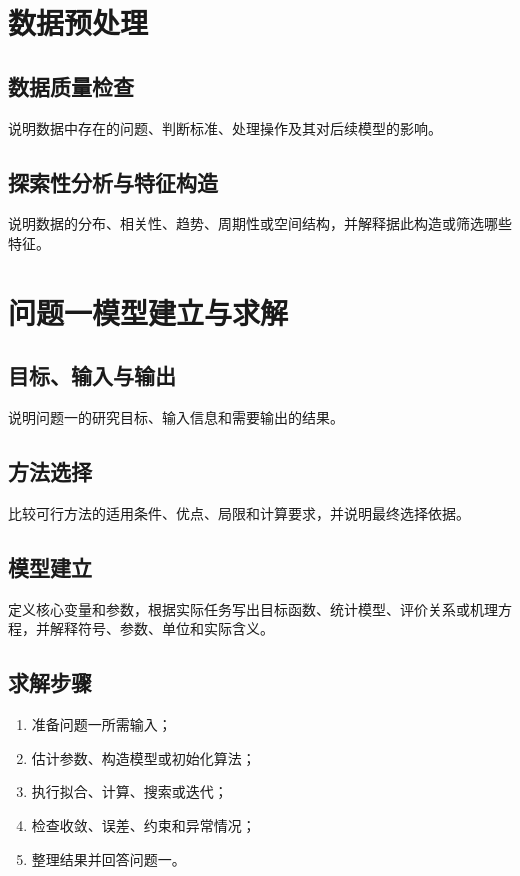 \documentclass[UTF8,a4paper,12pt]{ctexart}
\newif\ifshowguide
\newcommand{\WriteGuide}[3]{%
  \ifshowguide
  \begin{quote}
    \small
    \textbf{写什么：}#1\par
    \textbf{怎么写：}#2\par
    \textbf{避免：}#3
  \end{quote}
  \fi
}
\begin{document}
\section{数据预处理}

\WriteGuide
  {说明缺失、异常、重复、量纲、分布、编码和样本筛选问题。}
  {按照“发现问题—判断规则—处理操作—处理依据—结果影响”书写，并说明每一步如何服务后续模型。}
  {先看到模型结果再删数据；处理规则没有依据；标准化后仍误用原量纲阈值。}

\subsection{数据质量检查}
说明数据中存在的问题、判断标准、处理操作及其对后续模型的影响。

\subsection{探索性分析与特征构造}
说明数据的分布、相关性、趋势、周期性或空间结构，并解释据此构造或筛选哪些特征。

\section{问题一模型建立与求解}

\WriteGuide
  {按照“目标—输入—方法—模型—求解—结果—结论”完成问题一。}
  {给出必要公式、参数来源和求解步骤，并使用短段落直接回答题目。}
  {只堆公式；不解释参数来源；结果没有现实含义；结论没有回答问题。}

\subsection{目标、输入与输出}
说明问题一的研究目标、输入信息和需要输出的结果。

\subsection{方法选择}
比较可行方法的适用条件、优点、局限和计算要求，并说明最终选择依据。

\subsection{模型建立}
定义核心变量和参数，根据实际任务写出目标函数、统计模型、评价关系或机理方程，并解释符号、参数、单位和实际含义。

\subsection{求解步骤}
\begin{enumerate}[label=\textbf{Step \arabic*:},leftmargin=5.2em]
  \item 准备问题一所需输入；
  \item 估计参数、构造模型或初始化算法；
  \item 执行拟合、计算、搜索或迭代；
  \item 检查收敛、误差、约束和异常情况；
  \item 整理结果并回答问题一。
\end{enumerate}
\end{document}
